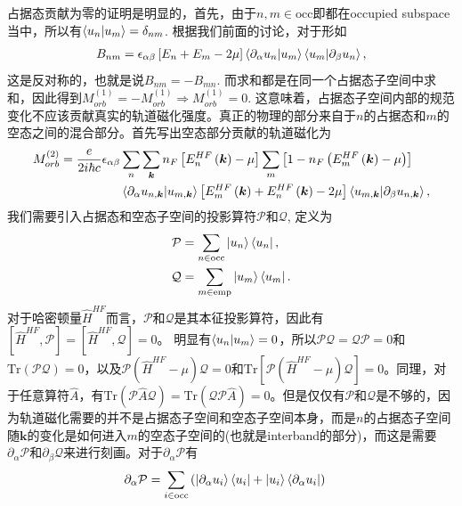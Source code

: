 \documentclass[10pt, oneside]{article}
\newcommand{\pa}{\partial}
\newcommand{\mr}[1]{\mathrm{#1}}
\newcommand{\p}[1]{\left(#1\right)}
\newcommand{\bb}[1]{\left[#1\right]}
\begin{document}
占据态贡献为零的证明是明显的，首先，由于\(n, m \in \mr{occ}\)即都在occupied subspace当中，所以有\(\braket{u_{n}|u_{m}} = \delta_{nm}\). 根据我们前面的讨论，对于形如
\begin{align}
	B_{nm} = \epsilon_{\alpha \beta} \bb{E_n + E_m - 2 \mu} \braket{\pa_{\alpha} u_n | u_m} \braket{u_m | \pa_{\beta} u_n},
\end{align}
这是反对称的，也就是说\(B_{nm} = - B_{mn}\). 而求和都是在同一个占据态子空间中求和，因此得到\(M^{\p{1}}_{orb} = - M^{\p{1}}_{orb} \Rightarrow M^{\p{1}}_{orb} = 0 \). 这意味着，占据态子空间内部的规范变化不应该贡献真实的轨道磁化强度。真正的物理的部分来自于\(n\)的占据态和\(m\)的空态之间的混合部分。首先写出空态部分贡献的轨道磁化为
\begin{align}
	\begin{split}
		M^{\p{2}}_{orb} = \frac{e}{2 i \hbar c} \epsilon_{\alpha \beta} & \sum_{n} \sum_{\bm{k}} n_{F} \bb{E^{HF}_{n} \p{\bm{k}}  - \mu } \sum_{m} \bb{1 - n_{F} \p{E^{HF}_{m} \p{\bm{k}} - \mu}}  \\
		&\braket{\pa_\alpha u_{n, \bm{k}} |u_{m , \bm{k}}} \bb{E^{HF}_{m}\p{\bm{k}} +E^{HF}_{n}\p{\bm{k}} - 2 \mu} \braket{u_{m, \bm{k}} | \pa_\beta u_{n, \bm{k}}},
	\end{split}
\end{align}
我们需要引入占据态和空态子空间的投影算符\(\mathcal{P}\)和\(\mathcal{Q}\), 定义为
\begin{align}
	\mathcal{P} &= \sum_{n \in \mr{occ}} \ket{u_n} \bra{u_n}, \\
	\mathcal{Q} &= \sum_{m \in \mr{emp}} \ket{u_m} \bra{u_m}.
\end{align}
对于哈密顿量\(\hat{H}^{HF}\)而言，\(\mathcal{P}\)和\(\mathcal{Q}\)是其本征投影算符，因此有\(\bb{\hat{H}^{HF}, \mathcal{P}} = \bb{\hat{H}^{HF}, \mathcal{Q}} = 0\)。 明显有\(\braket{u_n | u_m} =0\)，所以\(\mathcal{P} \mathcal{Q} = \mathcal{Q}\mathcal{P} = 0\)和\(\mr{Tr} \p{\mathcal{P}\mathcal{Q}} = 0\)，以及\(\mathcal{P} \p{\hat{H}^{HF} - \mu} \mathcal{Q} = 0\)和\(\mr{Tr}\bb{\mathcal{P} \p{\hat{H}^{HF} - \mu} \mathcal{Q}} = 0\)。同理，对于任意算符\(\hat{A}\)，有\(\mr{Tr} \p{\mathcal{P} \hat{A} \mathcal{Q}} = \mr{Tr} \p{\mathcal{Q} \mathcal{P} \hat{A}} = 0\)。但是仅仅有\(\mathcal{P}\)和\(\mathcal{Q}\)是不够的，因为轨道磁化需要的并不是占据态子空间和空态子空间本身，而是\(n\)的占据态子空间随\(\bm{k}\)的变化是如何进入\(m\)的空态子空间的(也就是interband的部分)，而这是需要\(\pa_{\alpha} \mathcal{P}\)和\(\pa_{\beta} \mathcal{Q}\)来进行刻画。对于\(\pa_{\alpha} \mathcal{P}\)有
\begin{align}
	\pa_{\alpha} \mathcal{P} &= \sum_{i \in \mr{occ}} \p{\ket{\pa_{\alpha} u_i} \bra{u_i} + \ket{u_i} \bra{\pa_{\alpha} u_i}} 
\end{align}
\end{document}
